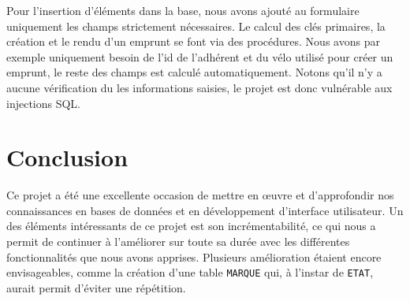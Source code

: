 \documentclass[10pt]{article}
\begin{document}
Pour l'insertion d'éléments dans la base, nous avons ajouté au formulaire uniquement les champs strictement nécessaires. Le calcul des clés primaires, la création et le rendu d'un emprunt se font via des procédures. Nous avons par exemple uniquement besoin de l'id de l'adhérent et du vélo utilisé pour créer un emprunt, le reste des champs est calculé automatiquement. Notons qu'il n'y a aucune vérification du les informations saisies, le projet est donc vulnérable aux injections SQL.

  \section{Conclusion}\label{sec:ccl}
  Ce projet a été une excellente occasion de mettre en \oe uvre et d'approfondir nos connaissances en bases de données et en développement d'interface utilisateur.
  Un des éléments intéressants de ce projet est son incrémentabilité, ce qui nous a permit de continuer à l'améliorer sur toute sa durée avec les différentes fonctionnalités que nous avons apprises.
  Plusieurs amélioration étaient encore envisageables, comme la création d'une table \texttt{MARQUE} qui, à l'instar de \texttt{ETAT}, aurait permit d'éviter une répétition.\\
  
\end{document}
